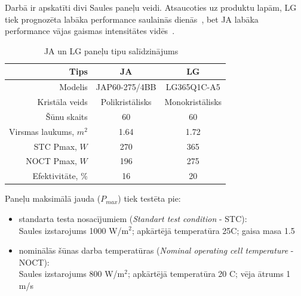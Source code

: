 Darbā ir apskatīti divi Saules paneļu veidi. Atsaucoties uz produktu lapām, LG tiek prognozēta labāka performance saulainās dienās~\cite{LGtips}, bet JA labāka performance vājas gaismas intensitātes vidēs~\cite{JAtips}.

\begin{table}[h]
    \caption{JA un LG paneļu tipu salīdzinājums~\cite{JAtips}~\cite{LGtips}} %
    \begin{center}
    \begin{tabular}{| r | c | c |}
    \hline
    Tips & JA & LG \\ \hline
    Modelis &  JAP60-275/4BB & LG365Q1C-A5\\ \hline
	Kristāla veids & Polikristālisks & Monokristālisks \\ \hline
	Šūnu skaits  &60  &60 \\ \hline
	Virsmas laukums, $m^2$ &1.64  &1.72 \\ \hline
	STC Pmax, $W$ 	&270 &365\\ \hline
	NOCT Pmax, $W$  &196 &275\\ \hline
	Efektivitāte, \% &16 & 20\\ \hline
    \end{tabular}
    \end{center}
    \label{tab:ja_lg_tipi}
\end{table}

Paneļu maksimālā jauda ($P_{max}$) tiek testēta pie:
\begin{itemize}
\item standarta testa nosacījumiem (\textit{Standart test condition} - STC):\\
Saules izstarojums 1000 W/m$^2$; apkārtējā temperatūra 25\textdegree C; gaisa masa 1.5
\item nominālās šūnas darba temperatūras (\textit{Nominal operating cell temperature} - NOCT):\\
Saules izstarojums 800 W/m$^2$; apkārtējā temperatūra 20 \textdegree C; vēja ātrums 1 m/s
\end{itemize}



